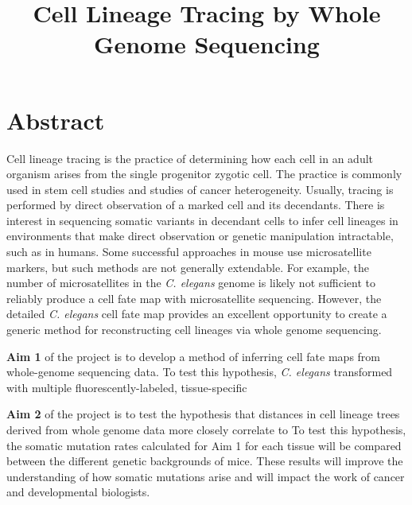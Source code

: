 \documentclass[12pt]{article}
\title{Cell Lineage Tracing by Whole Genome Sequencing}
\date{}
\begin{document}
\maketitle





\section{Abstract}

Cell lineage tracing is the practice of determining how each cell in an adult organism arises from the single progenitor zygotic cell.
The practice is commonly used in stem cell studies and studies of cancer heterogeneity.
Usually, tracing is performed by direct observation of a marked cell and its decendants.
There is interest in sequencing somatic variants in decendant cells to infer cell lineages in environments that make direct observation or genetic manipulation intractable, such as in humans.
Some successful approaches in mouse use microsatellite markers, but such methods are not generally extendable.
For example, the number of microsatellites in the \textit{C. elegans} genome is likely not sufficient to reliably produce a cell fate map with microsatellite sequencing.
However, the detailed \textit{C. elegans} cell fate map provides an excellent opportunity to create a generic method for reconstructing cell lineages via whole genome sequencing. 

\textbf{Aim 1} of the project is to develop a method of inferring cell fate maps from whole-genome sequencing data.
To test this hypothesis, \textit{C. elegans} transformed with multiple fluorescently-labeled, tissue-specific 

\textbf{Aim 2} of the project is to test the hypothesis that distances in cell lineage trees derived from whole genome data more closely correlate to 
To test this hypothesis, the somatic mutation rates calculated for Aim 1 for each tissue will be compared between the different genetic backgrounds of mice.
These results will improve the understanding of how somatic mutations arise and will impact the work of cancer and developmental biologists.
\end{document}
